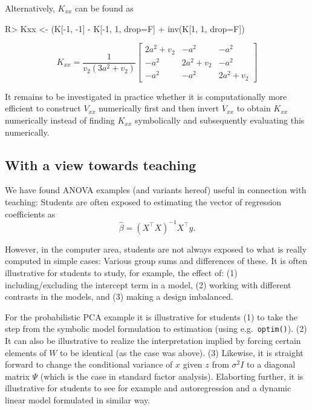 Alternatively, \(K_{xx}\) can be found as

\begin{Schunk}
\begin{Sinput}
R> Kxx <- (K[-1, -1] - K[-1, 1, drop=F] %
+           inv(K[1, 1, drop=F]) %
\end{Sinput}
\end{Schunk}

\[
 K_{xx} = \frac{1}{v_{2} \left(3 a^{2} + v_{2}\right)} \left[\begin{matrix}2 a^{2} + v_{2} & - a^{2} & - a^{2}\\- a^{2} & 2 a^{2} + v_{2} & - a^{2}\\- a^{2} & - a^{2} & 2 a^{2} + v_{2}\end{matrix}\right]
\]

It remains to be investigated in practice whether it is computationally
more efficient to construct \(V_{xx}\) numerically first and then invert
\(V_{xx}\) to obtain \(K_{xx}\) numerically instead of finding
\(K_{xx}\) symbolically and subsequently evaluating this numerically.

\hypertarget{with-a-view-towards-teaching}{%
\subsection{With a view towards
teaching}\label{with-a-view-towards-teaching}}

We have found ANOVA examples (and variants hereof) useful in connection
with teaching: Students are often exposed to estimating the vector of
regression coefficients as \[
\hat\beta = (X^\top X)^{-1} X^\top y.
\]

However, in the computer area, students are not always exposed to what
is really computed in simple cases: Various group sums and differences
of these. It is often illustrative for students to study, for example,
the effect of: (1) including/excluding the intercept term in a model,
(2) working with different contrasts in the models, and (3) making a
design imbalanced.

For the probabilistic PCA example it is illustrative for students (1) to
take the step from the symbolic model formulation to estimation (using
e.g.~\texttt{optim()}). (2) It can also be illustrative to realize the
interpretation implied by forcing certain elements of \(W\) to be
identical (as the case was above). (3) Likewise, it is straight forward
to change the conditional variance of \(x\) given \(z\) from
\(\sigma^2I\) to a diagonal matrix \(\Psi\) (which is the case in
standard factor analysis). Elaborting further, it is illustrative for
students to see for example and autoregression and a dynamic linear
model formulated in similar way.

